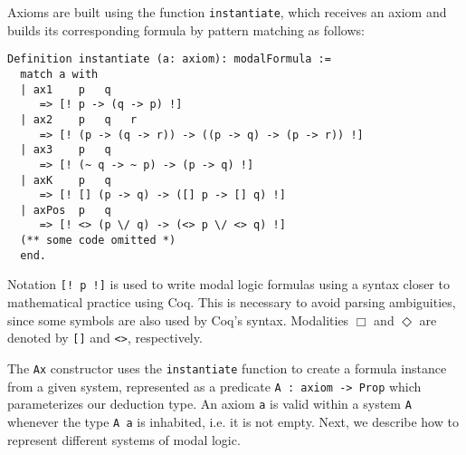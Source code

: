 \documentclass[sigconf,anonymous]{acmart}
\begin{document}
Axioms are built using the function \texttt{instantiate}, which
receives an axiom and builds its corresponding formula by pattern matching as
follows:
\begin{verbatim}
Definition instantiate (a: axiom): modalFormula :=
  match a with
  | ax1    p   q
     => [! p -> (q -> p) !]
  | ax2    p   q   r
     => [! (p -> (q -> r)) -> ((p -> q) -> (p -> r)) !]
  | ax3    p   q
     => [! (~ q -> ~ p) -> (p -> q) !]
  | axK    p   q
     => [! [] (p -> q) -> ([] p -> [] q) !]
  | axPos  p   q
     => [! <> (p \/ q) -> (<> p \/ <> q) !]
  (** some code omitted *)
  end.
\end{verbatim}
Notation \texttt{[! p !]} is used to write modal logic formulas using a
syntax closer to mathematical practice using Coq. This is necessary to avoid
parsing ambiguities, since some symbols are also used by Coq's syntax.
Modalities $\Box$ and $\Diamond$ are denoted by \texttt{[]}
and \texttt{<>}, respectively.

The \texttt{Ax} constructor uses the \texttt{instantiate}
function to create a formula instance from a given system,
represented as a predicate
\texttt{A : axiom -> Prop} which parameterizes our deduction type. An
axiom \texttt{a} is valid within a system \texttt{A} whenever
the type \texttt{A a} is inhabited, i.e. it is not empty. Next, we
describe how to represent different systems of modal logic.
\end{document}
